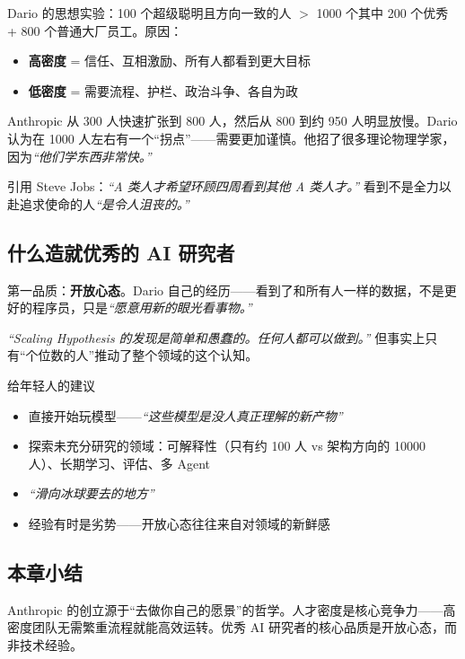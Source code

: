 \documentclass[a4paper]{article}
\begin{document}
Dario 的思想实验：100 个超级聪明且方向一致的人 $>$ 1000 个其中 200 个优秀 + 800 个普通大厂员工。原因：

\begin{itemize}
    \item \textbf{高密度} = 信任、互相激励、所有人都看到更大目标
    \item \textbf{低密度} = 需要流程、护栏、政治斗争、各自为政
\end{itemize}

Anthropic 从 300 人快速扩张到 800 人，然后从 800 到约 950 人明显放慢。Dario 认为在 1000 人左右有一个``拐点''——需要更加谨慎。他招了很多理论物理学家，因为\textit{``他们学东西非常快。''}

引用 Steve Jobs：\textit{``A 类人才希望环顾四周看到其他 A 类人才。''} 看到不是全力以赴追求使命的人\textit{``是令人沮丧的。''}

\subsection{什么造就优秀的 AI 研究者}

第一品质：\textbf{开放心态}。Dario 自己的经历——看到了和所有人一样的数据，不是更好的程序员，只是\textit{``愿意用新的眼光看事物。''}

\textit{``Scaling Hypothesis 的发现是简单和愚蠢的。任何人都可以做到。''} 但事实上只有``个位数的人''推动了整个领域的这个认知。

\begin{knowledgebox}{给年轻人的建议}
\begin{itemize}
    \item 直接开始玩模型——\textit{``这些模型是没人真正理解的新产物''}
    \item 探索未充分研究的领域：可解释性（只有约 100 人 vs 架构方向的 10000 人）、长期学习、评估、多 Agent
    \item \textit{``滑向冰球要去的地方''}
    \item 经验有时是劣势——开放心态往往来自对领域的新鲜感
\end{itemize}
\end{knowledgebox}

\subsection{本章小结}

Anthropic 的创立源于``去做你自己的愿景''的哲学。人才密度是核心竞争力——高密度团队无需繁重流程就能高效运转。优秀 AI 研究者的核心品质是开放心态，而非技术经验。
\end{document}
